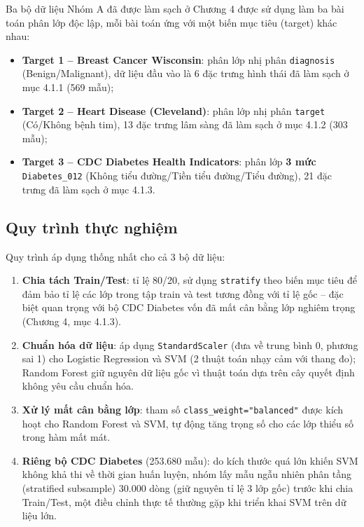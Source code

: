 Ba bộ dữ liệu Nhóm A đã được làm sạch ở Chương 4 được sử dụng làm ba bài toán phân lớp độc lập, mỗi bài toán ứng với một biến mục tiêu (target) khác nhau:
\begin{itemize}
    \item \textbf{Target 1 -- Breast Cancer Wisconsin}: phân lớp nhị phân \texttt{diagnosis} (Benign/Malignant), dữ liệu đầu vào là 6 đặc trưng hình thái đã làm sạch ở mục 4.1.1 (569 mẫu);
    \item \textbf{Target 2 -- Heart Disease (Cleveland)}: phân lớp nhị phân \texttt{target} (Có/Không bệnh tim), 13 đặc trưng lâm sàng đã làm sạch ở mục 4.1.2 (303 mẫu);
    \item \textbf{Target 3 -- CDC Diabetes Health Indicators}: phân lớp \textbf{3 mức} \texttt{Diabetes\_012} (Không tiểu đường/Tiền tiểu đường/Tiểu đường), 21 đặc trưng đã làm sạch ở mục 4.1.3.
\end{itemize}

\subsection{Quy trình thực nghiệm}

Quy trình áp dụng thống nhất cho cả 3 bộ dữ liệu:
\begin{enumerate}
    \item \textbf{Chia tách Train/Test}: tỉ lệ 80/20, sử dụng \texttt{stratify} theo biến mục tiêu để đảm bảo tỉ lệ các lớp trong tập train và test tương đồng với tỉ lệ gốc -- đặc biệt quan trọng với bộ CDC Diabetes vốn đã mất cân bằng lớp nghiêm trọng (Chương 4, mục 4.1.3).
    \item \textbf{Chuẩn hóa dữ liệu}: áp dụng \texttt{StandardScaler} (đưa về trung bình 0, phương sai 1) cho Logistic Regression và SVM (2 thuật toán nhạy cảm với thang đo); Random Forest giữ nguyên dữ liệu gốc vì thuật toán dựa trên cây quyết định không yêu cầu chuẩn hóa.
    \item \textbf{Xử lý mất cân bằng lớp}: tham số \texttt{class\_weight="balanced"} được kích hoạt cho Random Forest và SVM, tự động tăng trọng số cho các lớp thiểu số trong hàm mất mát.
    \item \textbf{Riêng bộ CDC Diabetes} (253.680 mẫu): do kích thước quá lớn khiến SVM không khả thi về thời gian huấn luyện, nhóm lấy mẫu ngẫu nhiên phân tầng (stratified subsample) 30.000 dòng (giữ nguyên tỉ lệ 3 lớp gốc) trước khi chia Train/Test, một điều chỉnh thực tế thường gặp khi triển khai SVM trên dữ liệu lớn.
\end{enumerate}

